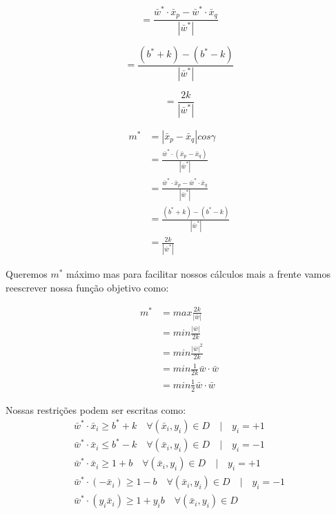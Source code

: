 \begin{equation}
= \frac{\bar{w}^*\cdot\bar{x}_p-\bar{w}^*\cdot\bar{x}_q}{|\bar{w}^*|}
    \label{eq:LABEL_EQ_4}
\end{equation}

\begin{equation}
= \frac{(b^*+k)-(b^*-k)}{|\bar{w}^*|}
    \label{eq:LABEL_EQ_5}
\end{equation}

\begin{equation}
= \frac{2k}{|\bar{w}^*|}
    \label{eq:LABEL_EQ_6}
\end{equation}

\begin{equation}
\begin{split}
m^* &= |\bar{x}_p-\bar{x}_q|cos\gamma\\
    &= \frac{\bar{w}^*\cdot(\bar{x}_p-\bar{x}_q)}{|\bar{w}^*|}\\
    &= \frac{\bar{w}^*\cdot\bar{x}_p-\bar{w}^*\cdot\bar{x}_q}{|\bar{w}^*|}\\
    &= \frac{(b^*+k)-(b^*-k)}{|\bar{w}^*|}\\
    &= \frac{2k}{|\bar{w}^*|}
\end{split}
\end{equation}

Queremos $m^*$ máximo mas para facilitar nossos cálculos mais a frente vamos reescrever nossa função objetivo como:

\begin{equation}
\begin{split}
m^* &= max \frac{2k}{|\bar{w}|} \\
    &= min \frac{|\bar{w}|}{2k} \\
    &= min \frac{|\bar{w}|^2}{2k}  \\
    &= min \frac{1}{2k} \bar{w}\cdot\bar{w}  \\
    &= min \frac{1}{2} \bar{w}\cdot\bar{w}
\end{split}
\end{equation}

Nossas restrições podem ser escritas como:
\begin{equation}
\begin{split}
\bar{w}^*\cdot\bar{x}_i \ge b^*+k \quad \forall (\bar{x}_i,y_i)\in D \quad | \quad y_i=+1 \\
\bar{w}^*\cdot\bar{x}_i \le b^*-k \quad \forall (\bar{x}_i,y_i)\in D \quad | \quad y_i=-1 \\
\bar{w}^*\cdot\bar{x}_i \ge 1+b \quad \forall (\bar{x}_i,y_i)\in D \quad | \quad y_i=+1 \\
\bar{w}^*\cdot(-\bar{x}_i) \ge 1-b \quad \forall (\bar{x}_i,y_i)\in D \quad | \quad y_i=-1 \\
\bar{w}^*\cdot(y_i\bar{x}_i) \ge 1+y_i b \quad \forall (\bar{x}_i,y_i)\in D
\end{split}
\end{equation}

